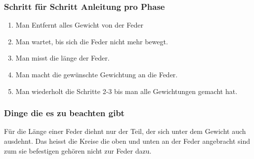 \documentclass[../main.tex]{subfiles} %
\begin{document}
        \subsubsection{Schritt für Schritt Anleitung pro Phase}\label{subsubsec:schritt-fur-schritt-anleitung2}
        \begin{enumerate}
            \item Man Entfernt alles Gewicht von der Feder
            \item Man wartet, bis sich die Feder nicht mehr bewegt.
            \item Man misst die länge der Feder.
            \item Man macht die gewünschte Gewichtung an die Feder.
            \item Man wiederholt die Schritte 2-3 bis man alle Gewichtungen gemacht hat.
        \end{enumerate}

        \subsubsection{Dinge die es zu beachten gibt}\label{subsubsec:dinge-die-es-zu-beachten-gibt}
        Für die Länge einer Feder diehnt nur der Teil, der sich unter dem Gewicht auch ausdehnt.
        Das heisst die Kreise die oben und unten an der Feder angebracht sind zum sie befestigen gehören nicht zur Feder dazu.
\end{document}
